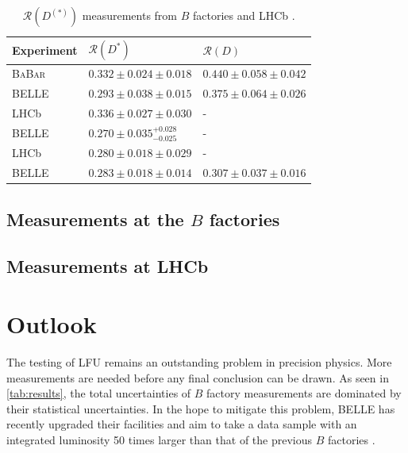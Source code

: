 \documentclass[12pt,letterpaper]{article}
\def\BaBar/{\textsc{BaBar}}
\def\RD/{\ensuremath{\mathcal{R}(D)}}
\def\RDst/{\ensuremath{\mathcal{R}(D^{*})}}
\def\RDDst/{\ensuremath{\mathcal{R}(D^{(*)})}}
\begin{document}
\begin{table}[ht]
    \centering
    \caption{
        \RDDst/ measurements from $B$ factories and LHCb \cite{HFLAV:2019}.
    }
    \label{tab:results}
    \vspace{1em}
    \begin{tabular}{lll}
        \toprule
        Experiment  &  \RDst/                               &  \RD/                         \\
        \midrule
        \BaBar/     &  $0.332 \pm 0.024 \pm 0.018$          &  $0.440 \pm 0.058 \pm 0.042$  \\
        BELLE       &  $0.293 \pm 0.038 \pm 0.015$          &  $0.375 \pm 0.064 \pm 0.026$  \\
        LHCb        &  $0.336 \pm 0.027 \pm 0.030$          &  -                            \\
        BELLE       &  $0.270 \pm 0.035^{+0.028}_{-0.025}$  &  -                            \\
        LHCb        &  $0.280 \pm 0.018 \pm 0.029$          &  -                            \\
        BELLE       &  $0.283 \pm 0.018 \pm 0.014$          &  $0.307 \pm 0.037 \pm 0.016$  \\
        \bottomrule
    \end{tabular}
\end{table}

\subsection{Measurements at the $B$ factories} \label{sec:meas_bfactories}


\subsection{Measurements at LHCb} \label{sec:meas_lhcb}


\section{Outlook}
The testing of LFU remains an outstanding problem in precision
physics.
More measurements are needed before any final conclusion can be drawn.
As seen in \autoref{tab:results}, the total uncertainties of $B$ factory
measurements are dominated by their statistical uncertainties.
In the hope to mitigate this problem, BELLE has recently upgraded their
facilities and aim to take a data sample with an integrated luminosity 50 times
larger than that of the previous $B$ factories \cite{Abe:2010gxa}.
\end{document}
